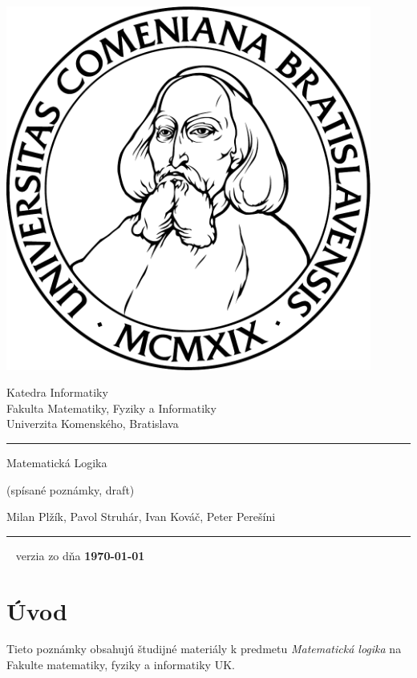 \documentclass[a4paper]{report}
\begin{document}
\thispagestyle{empty}
\begin{minipage}{0.25\textwidth}
\includegraphics[width=0.9\textwidth]{img/komlogo-new}
\end{minipage}
\begin{minipage}{0.69\textwidth}
\begin{center}
\sc Katedra Informatiky \\
Fakulta Matematiky, Fyziky a Informatiky \\
Univerzita Komenského, Bratislava
\end{center}
\end{minipage}

\vfill
\begin{center}
\begin{minipage}{0.8\textwidth}
\hrule
\bigskip\bigskip
\centerline{\LARGE\sc Matematická Logika}
\smallskip
\centerline{(spísané poznámky, draft)}
\bigskip
\bigskip
\centerline{\large\sc Milan Plžík, Pavol Struhár, Ivan Kováč, Peter Perešíni}
\bigskip\bigskip
\hrule
\end{minipage}
\end{center}
\vfill
{~}
\hfill verzia zo dňa {\bf\today} 
\eject %

\section*{Úvod}

Tieto poznámky obsahujú študijné materiály
k predmetu \emph{Matematická logika}
na Fakulte matematiky, fyziky a informatiky UK.
\end{document}
